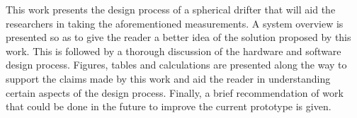 This work presents the design process of a spherical drifter that will aid the researchers in taking the aforementioned measurements. A system overview is presented so as to give the reader a better idea of the solution proposed by this work.  This is followed by a thorough discussion of the hardware and software design process.  Figures, tables and calculations are presented along the way to support the claims made by this work and aid the reader in understanding certain aspects of the design process.  Finally, a brief recommendation of work that could be done in the future to improve the current prototype is given.  
